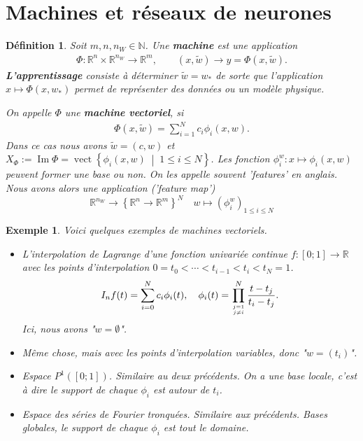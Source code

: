 \documentclass[11pt,a4paper, french]{article}
\newcommand{\nparammodel}{n_W}
\newcommand{\N}{\mathbb N}
\newcommand{\R}{\mathbb R}
\newcommand{\Set}[1]{\left\{#1\right\}}
\newcommand{\vect}[2]{\operatorname{vect}\left\{#1\;\middle|\;#2\right\}}
\newcommand{\im}{\operatorname{Im}}
\newtheorem{definition}[theorem]{Définition}
\newtheorem{example}[theorem]{Exemple}
\begin{document}
\section{Machines et réseaux de neurones}\label{sec:}
%
%
\begin{definition}\label{definition:}
Soit $m,n,\nparammodel\in\N$. Une \textbf{machine} est une application 
\begin{align*}
\Phi:\R^n\times \R^{\nparammodel}\to \R^m,\qquad (x,\tilde w)\to y = \Phi(x,\tilde w).
\end{align*}
\textbf{L'apprentissage} consiste à déterminer $\tilde w=w_*$ de sorte que l'application $x\mapsto \Phi(x,w_*)$ permet de représenter des données ou un modèle physique.

On appelle $\Phi$ une \textbf{machine vectoriel}, si
\begin{align*}
\Phi(x,\tilde w) = \sum_{i=1}^N c_i \phi_i(x,w).
\end{align*}
Dans ce cas nous avons $\tilde w = (c,w)$ et $X_{\Phi}:=\im\Phi =\vect{\phi_i(x,w)}{1\le i\le N}$.
Les fonction $\phi_i^{w} : x\mapsto \phi_i(x,w)$ peuvent former une base ou non. On les appelle souvent 'features' en anglais. 
Nous avons alors une application ('feature map')
%
\begin{equation}\label{equation:}
\R^{\nparammodel}\to \Set{\R^n\to \R^m}^N\quad w\mapsto (\phi_i^{w})_{1\le i\le N}
\end{equation}
%
%
\end{definition}
%
%
\begin{example}\label{example:}
Voici quelques exemples de machines vectoriels.
\begin{itemize}
\item L'interpolation de Lagrange d'une fonction univariée continue $f:[0;1]\to\R$ avec les points d'interpolation $0 = t_0 < \cdots < t_{i-1}<t_{i} < t_N=1$.
\begin{align*}
I_n f(t) = \sum_{i=0}^N c_i \phi_i(t),\quad \phi_i(t)=\prod_{j=1\atop j\ne i}^{N} \frac{t-t_j}{t_i-t_j}.
\end{align*}
Ici, nous avons "$w=\emptyset$".
\item Même chose, mais avec les points d'interpolation variables, donc "$w=(t_i)$".
\item Espace $P^1([0;1])$. Similaire au deux précédents. On a une base locale, c'est à dire le support de chaque $\phi_i$ est autour de $t_i$.
\item Espace des séries de Fourier tronquées. Similaire aux précédents. Bases globales, le support de chaque $\phi_i$ est tout le domaine.
\end{itemize}
\end{example}
\end{document}
